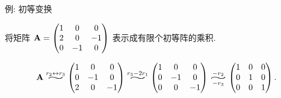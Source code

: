 \begin{frame}{例: 初等变换}
	\beqskip{0mm}
	\onslide<+->
	\vspace{-.3\baselineskip}
	\begin{example}
		\vspace{-.3\baselineskip}
		将矩阵 ${\mathbf{A}}=\begin{pmatrix}
			1&0&0\\
			2&0&-1\\
			0&-1&0
		\end{pmatrix}$ 表示成有限个初等阵的乘积.
		\vspace{-.2\baselineskip}
	\end{example}
	\onslide<+->
	\begin{solution}
		\vspace{-.3\baselineskip}
		\[\bfA\wsim{r_2\swap r_3}{}\begin{pmatrix}
			1&0&0\\
			0&-1&0\\
			2&0&-1
		\end{pmatrix}
		\wsim{r_3-2r_1}{}\begin{pmatrix}
			1&0&0\\
			0&-1&0\\
			0&0&-1
		\end{pmatrix}
		\wsim{-r_2}{-r_3}\begin{pmatrix}
			1&0&0\\
			0&1&0\\
			0&0&1
		\end{pmatrix}.\]
		\onslide<+->{%
		\[\bfA=\begin{pmatrix}
			1&0&0\\0&0&1\\0&1&0

\end{pmatrix}\]}
\end{solution}
\end{frame}
